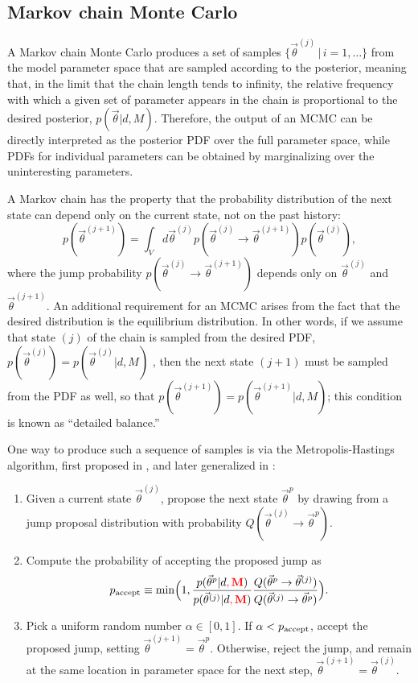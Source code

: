 \documentclass{iopart}
\newcommand{\vtheta}{\vec{\theta}}
\newcommand{\be}{\begin{equation}}
\newcommand{\ee}{\end{equation}}
\newcommand{\bel}[1]{\begin{equation}\label{#1}}
\newcommand{\ilya}[1]{{\color{red} \bf #1}}
\begin{document}
\subsection{Markov chain Monte Carlo} \label{sec:mcmc}

A Markov chain Monte Carlo \cite{Gilks:1996} produces a set of samples
$\{ \vtheta^{(j)} \, | \, i = 1, \ldots \}$ from the model parameter
space that are sampled according to the posterior, meaning that, in
the limit that the chain length tends to infinity, the relative
frequency with which a given set of parameter appears in the chain is
proportional to the desired posterior, $p(\vtheta|d,M)$.  Therefore,
the output of an MCMC can be directly interpreted as the posterior PDF
over the full parameter space, while PDFs for individual parameters
can be obtained by marginalizing over the uninteresting parameters.

A Markov chain has the property that the probability distribution of
the next state can depend only on the current state, not on the past
history: 
%
\be 
p(\vtheta^{(j+1)})=\int_{V} d\vtheta^{(j)} p(\vtheta^{(j)} \to
\vtheta^{(j+1)}) p(\vtheta^{(j)}), \ee
%
where the jump probability $p(\vtheta^{(j)} \to \vtheta^{(j+1)})$
depends only on $\vtheta^{(j)}$ and $\vtheta^{(j+1)}$.  An additional
requirement for an MCMC arises from the fact that the desired
distribution is the equilibrium distribution.  In other words, if we
assume that state $(j)$ of the chain is sampled from the desired PDF,
$p(\vtheta^{(j)})=p(\vtheta^{(j)}|d,M)$ , then the next state $(j+1)$ must
be sampled from the PDF as well, so that
$p(\vtheta^{(j+1)})=p(\vtheta^{(j+1)}|d,M)$; this condition is known as
``detailed balance.''

One way to produce such a sequence of samples is via the
Metropolis-Hastings algorithm, first proposed in
\cite{Metropolis:1953}, and later generalized in
\cite{Hastings:1970}:
\begin{enumerate}
\item Given a current state $\vtheta^{(j)}$, propose the next state
  $\vtheta^p$ by drawing from a jump proposal distribution with
  probability $Q(\vtheta^{(j)} \to \vtheta^p)$.
\item Compute the probability of accepting the proposed jump as
  \bel{eq:p-accept} 
p_{\textnormal{accept}} \equiv \min\Bigl(1,
\frac{p(\vtheta^p|d\ilya{,M})}{p(\vtheta^{(j)}|d\ilya{,M})} \frac{Q(\vtheta^p \to
  \vtheta^{(j)})}{Q(\vtheta^{(j)} \to \vtheta^p)} \Bigr).  
\ee
\item Pick a uniform random number $\alpha \in [0,1]$.  If $\alpha<
  p_{\textnormal{accept}}$, accept the proposed jump, setting
  $\vtheta^{(j+1)}=\vtheta^p$.  Otherwise, reject the jump, and remain
  at the same location in parameter space for the next step,
  $\vtheta^{(j+1)}=\vtheta^{(j)}$.
\end{enumerate}
 
\end{document}
